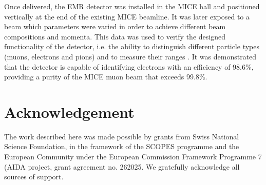 \documentclass[a4paper,11pt]{article}
\begin{document}
Once delivered, the EMR detector was installed in the MICE hall and positioned vertically at the end of the existing MICE beamline. It was later exposed
to a beam which parameters were varied in order to achieve different beam compositions and momenta. This data was used to verify the designed 
functionality of the detector, i.e. the ability to distinguish different particle types (muons, electrons and pions) and to measure their ranges
\cite{performance}. It was demonstrated that the detector is capable of identifying electrons with an efficiency of 98.6\%, providing a purity of the
MICE muon beam that exceeds 99.8\%.

\section*{Acknowledgement}
The work described here was made possible by grants from Swiss National Science Foundation, in the framework of the SCOPES programme and the European
Community under the European Commission Framework Programme 7 (AIDA project, grant agreement no. 262025. We gratefully acknowledge all sources of support.




\end{document}
